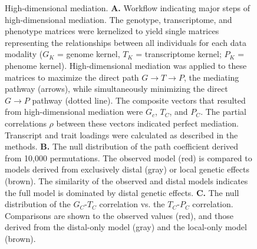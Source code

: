 \documentclass[
]{article}
\begin{document}
\begin{figure}[ht!]
\caption{High-dimensional mediation. \textbf{A.} Workflow 
indicating major steps of high-dimensional mediation. The 
genotype, transcriptome, and phenotype matrices were 
kernelized to yield single matrices representing the 
relationships between all individuals for each data modality 
($G_K$ = genome kernel, $T_K$ = transcriptome kernel; 
$P_K$ = phenome kernel). High-dimensional mediation 
was applied to these matrices to maximize the direct path 
$G \rightarrow T \rightarrow P$, the mediating pathway 
(arrows), while simultaneously minimizing the direct $G 
\rightarrow P$ pathway (dotted line). The composite 
vectors that resulted from high-dimensional mediation 
were $G_c$, $T_C$, and $P_C$. The partial correlations 
$\rho$ between these vectors indicated perfect mediation. 
Transcript and trait loadings were calculated as described 
in the methods. \textbf{B.} The null distribution of the path 
coefficient derived from 10,000 permutations. The observed model
(red) is compared to models derived from exclusively distal 
(gray) or local genetic effects (brown). The similarity of 
the observed and distal models indicates the full model is 
dominated by distal genetic effects. \textbf{C.} 
The null distribution of the $G_C$-$T_C$ correlation vs. 
the $T_C$-$P_C$ correlation. Comparisons are shown 
to the observed values (red), and those derived from the 
distal-only model (gray) and the local-only model (brown).
}
\label{fig:workflow}
\end{figure}
\end{document}
